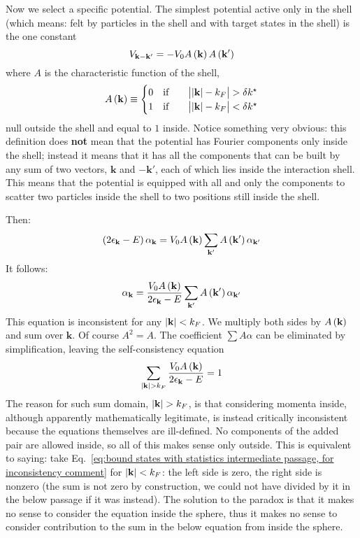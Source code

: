 Now we select a specific potential. The simplest potential active only in the shell (which means: felt by particles in the shell and with target states in the shell) is the one constant
\[
	V_{\mathbf{k}-\mathbf{k}'} = - V_0 A\left({\mathbf{k}}\right) A\left({\mathbf{k}'}\right)
\]
where $A$ is the characteristic function of the shell,
\[
	A\lrR{\mathbf{k}} \equiv \begin{cases}
		0 \qq{if} &\abs{\abs{\mathbf{k}}-k_F \vphantom{A^A}} > \delta k^\star \\
		1 \qq{if} &\abs{\abs{\mathbf{k}}-k_F \vphantom{A^A}} < \delta k^\star	\end{cases}
\]
null outside the shell and equal to $1$ inside. Notice something very obvious: this definition does \textbf{not} mean that the potential has Fourier components only inside the shell; instead it means that it has all the components that can be built by any sum of two vectors, $\mathbf{k}$ and $-\mathbf{k}'$, each of which lies inside the interaction shell. This means that the potential is equipped with all and only the components to scatter two particles inside the shell to two positions still inside the shell.

Then:
\[
	\left({2 \epsilon_\mathbf{k} - E}\right) \alpha_\mathbf{k} = V_0 A\left({\mathbf{k}}\right) \sum_{\mathbf{k}'} A\left({\mathbf{k}'}\right) \alpha_{\mathbf{k}'}
\]
It follows:
\begin{equation}\label{eq:bound states with statistics intermediate passage, for inconsistency comment}
	\alpha_\mathbf{k} = \frac{V_0 A\left({\mathbf{k}}\right)}{2 \epsilon_\mathbf{k} - E} \sum_{\mathbf{k}'} A\left({\mathbf{k}'}\right) \alpha_{\mathbf{k}'}
\end{equation}
This equation is inconsistent for any $\abs{\mathbf{k}}<k_F$.
We multiply both sides by $A\left({\mathbf{k}}\right)$ and sum over $\mathbf{k}$. Of course $A^2 = A$. The coefficient $\sum A \alpha$ can be eliminated by simplification, leaving the self-consistency equation
\[
	\sum_{\abs{\mathbf{k}}>k_F} \frac{V_0 A\left({\mathbf{k}}\right)}{2 \epsilon_\mathbf{k} - E} = 1
\]
The reason for such sum domain, $\abs{\mathbf{k}}>k_F$, is that considering momenta inside, although apparently mathematically legitimate, is instead critically inconsistent because the equations themselves are ill-defined. No components of the added pair are allowed inside, so all of this makes sense only outside. This is equivalent to saying: take Eq.~\eqref{eq:bound states with statistics intermediate passage, for inconsistency comment} for $\abs{\mathbf{k}}<k_F$: the left side is zero, the right side is nonzero (the sum is not zero by construction, we could not have divided by it in the below passage if it was instead). The solution to the paradox is that it makes no sense to consider the equation inside the sphere, thus it makes no sense to consider contribution to the sum in the below equation from inside the sphere.

